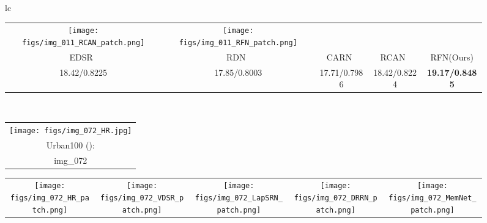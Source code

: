 \documentclass[preprint]{elsarticle}
\begin{document}
\begin{figure*}[htpb]
{\begin{tabular}{lc}
\begin{adjustbox}{valign=t}
\begin{tabular}{ccccc}
				\hspace{-3mm}
				\texttt{[image: figs/img\_011\_RCAN\_patch.png]} &
				\hspace{-3mm}
				\texttt{[image: figs/img\_011\_RFN\_patch.png]} \\
				EDSR~\cite{EDSR} &\hspace{-3mm} RDN~\cite{RDN} &\hspace{-3mm} CARN~\cite{CARN} &\hspace{-3mm} RCAN~\cite{RCAN} &\hspace{-3mm} RFN(Ours) \\
				18.42/0.8225 &\hspace{-3mm} 17.85/0.8003 &\hspace{-3mm} 17.71/0.7986 &\hspace{-3mm} 18.42/0.8224 &\hspace{-3mm} \textbf{19.17/0.8485} \\
			\end{tabular}
		\end{adjustbox}
		\\
		\begin{adjustbox}{valign=t}
			\scriptsize
			\begin{tabular}{c}
				\texttt{[image: figs/img\_072\_HR.jpg]} \\
				Urban100 (): \\
				img\_072 \\
			\end{tabular}
		\end{adjustbox}
		\hspace{-4mm}
		\begin{adjustbox}{valign=t}
			\scriptsize
			\begin{tabular}{ccccc}
				\texttt{[image: figs/img\_072\_HR\_patch.png]} &
				\hspace{-3mm}
				\texttt{[image: figs/img\_072\_VDSR\_patch.png]} &
				\hspace{-3mm}
				\texttt{[image: figs/img\_072\_LapSRN\_patch.png]} & 
				\hspace{-3mm}
				\texttt{[image: figs/img\_072\_DRRN\_patch.png]} &
				\hspace{-3mm}
				\texttt{[image: figs/img\_072\_MemNet\_patch.png]} \\

\end{tabular}
\end{adjustbox}
\end{tabular}}
\end{figure*}
\end{document}
